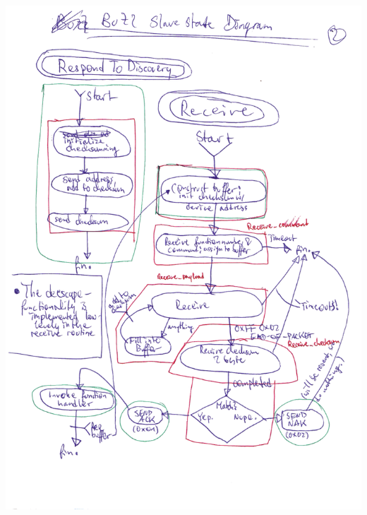 \documentclass[12pt,a4paper,notitlepage]{article}
\begin{document}
\begin{center}
\includegraphics[width=\textwidth]{images/image3_enhanced_small.png}
\newpage

\end{center}
\end{document}
